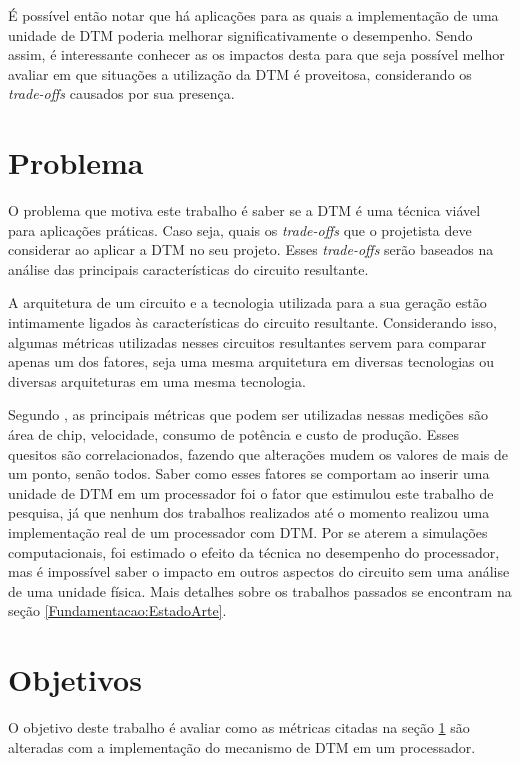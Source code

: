 É possível então notar que há aplicações para as quais a implementação de uma unidade de DTM poderia melhorar significativamente o desempenho. Sendo assim, é interessante conhecer as os impactos desta para que seja possível melhor avaliar em que situações a utilização da DTM é proveitosa, considerando os \textit{trade-offs} causados por sua presença.

\section{Problema}
\label{Introducao:Problema}

O problema que motiva este trabalho é saber se a DTM é uma técnica viável para aplicações práticas. Caso seja, quais os \textit{trade-offs} que o projetista deve considerar ao aplicar a DTM no seu projeto. Esses \textit{trade-offs} serão baseados na análise das principais características do circuito resultante.

A arquitetura de um circuito e a tecnologia utilizada para a sua geração estão intimamente ligados às características do circuito resultante. Considerando isso, algumas métricas utilizadas nesses circuitos resultantes servem para comparar apenas um dos fatores, seja uma mesma arquitetura em diversas tecnologias ou diversas arquiteturas em uma mesma tecnologia.

Segundo , as principais métricas que podem ser utilizadas nessas medições são área de chip, velocidade, consumo de potência e custo de produção. Esses quesitos são correlacionados, fazendo que alterações mudem os valores de mais de um ponto, senão todos. Saber como esses fatores se comportam ao inserir uma unidade de DTM em um processador foi o fator que estimulou este trabalho de pesquisa, já que nenhum dos trabalhos realizados até o momento realizou uma implementação real de um processador com DTM. Por se aterem a simulações computacionais, foi estimado o efeito da técnica no desempenho do processador, mas é impossível saber o impacto em outros aspectos do circuito sem uma análise de uma unidade física. Mais detalhes sobre os trabalhos passados se encontram na seção \ref{Fundamentacao:EstadoArte}.

\section{Objetivos}
\label{Introducao:Objetivos} %

O objetivo deste trabalho é avaliar como as métricas citadas na seção \ref{Introducao:Problema} são alteradas com a implementação do mecanismo de DTM em um processador.


